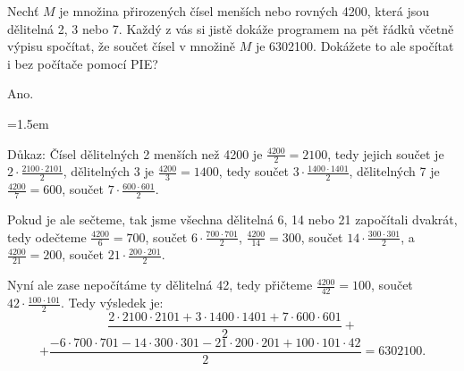 \documentclass[12pt]{article}					%
\begin{document}
\begin{priklad}[3]
    Nechť $M$ je množina přirozených čísel menších nebo rovných 4200, která jsou dělitelná 2, 3 nebo 7. Každý z vás si jistě dokáže programem na pět řádků včetně výpisu spočítat, že součet čísel v množině $M$ je 6302100. Dokážete to ale spočítat i bez počítače pomocí PIE?

    \begin{reseni}
        Ano.

        \baselineskip=1.5em

        Důkaz: Čísel dělitelných 2 menších než 4200 je $\frac{4200}{2} = 2100$, tedy jejich součet je $2·\frac{2100·2101}{2}$, dělitelných 3 je $\frac{4200}{3} = 1400$, tedy součet $3·\frac{1400 · 1401}{2}$, dělitelných 7 je $\frac{4200}{7} = 600$, součet $7·\frac{600·601}{2}$.

        Pokud je ale sečteme, tak jsme všechna dělitelná 6, 14 nebo 21 započítali dvakrát, tedy odečteme $\frac{4200}{6} = 700$, součet $6·\frac{700·701}{2}$, $\frac{4200}{14} = 300$, součet $14·\frac{300·301}{2}$, a $\frac{4200}{21} = 200$, součet $21·\frac{200·201}{2}$.

        Nyní ale zase nepočítáme ty dělitelná 42, tedy přičteme $\frac{4200}{42} = 100$, součet $42·\frac{100·101}{2}$. Tedy výsledek je:
$$ \frac{2·2100·2101 + 3·1400·1401 + 7·600·601}{2} +$$  $$ + \frac{- 6·700·701 - 14·300·301 - 21·200·201 + 100·101·42}{2} = 6302100.$$ 
        
    \end{reseni}

\end{priklad}
\end{document}
